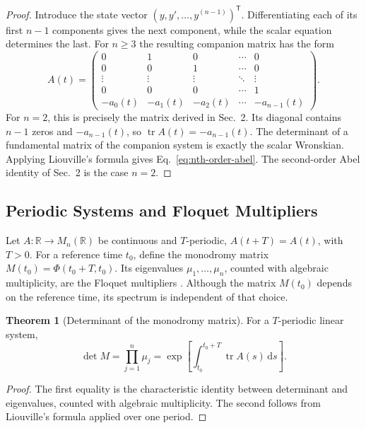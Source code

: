 \documentclass[11pt,a4paper]{article}
\newcommand{\be}{\begin{equation}}
\newcommand{\ee}{\end{equation}}
\newcommand{\lb}[1]{\label{#1}}
\newcommand{\dd}{\mathrm{d}}
\newcommand{\R}{\mathbb{R}}
\DeclareMathOperator{\tr}{tr}
\theoremstyle{definition}
\newtheorem{theorem}{Theorem}[section]
\numberwithin{equation}{section}
\begin{document}
\begin{proof}
Introduce the state vector $(y,y',\ldots,y^{(n-1)})^{\mathsf T}$. Differentiating each of its first $n-1$ components gives the next component, while the scalar equation determines the last. For $n\geq3$ the resulting companion matrix has the form
\be
A(t)=\begin{pmatrix}
0&1&0&\cdots&0\\
0&0&1&\cdots&0\\
\vdots&\vdots&\vdots&\ddots&\vdots\\
0&0&0&\cdots&1\\
-a_0(t)&-a_1(t)&-a_2(t)&\cdots&-a_{n-1}(t)
\end{pmatrix}.
\lb{eq:abel-general-companion}
\ee
For $n=2$, this is precisely the matrix derived in Sec.~2. Its diagonal contains $n-1$ zeros and $-a_{n-1}(t)$, so $\tr A(t)=-a_{n-1}(t)$. The determinant of a fundamental matrix of the companion system is exactly the scalar Wronskian. Applying Liouville's formula gives Eq.~\eqref{eq:nth-order-abel}. The second-order Abel identity of Sec.~2 is the case $n=2$.
\end{proof}

\subsection{Periodic Systems and Floquet Multipliers}

Let $A:\R\to M_n(\R)$ be continuous and $T$-periodic, $A(t+T)=A(t)$, with $T>0$. For a reference time $t_0$, define the monodromy matrix $M(t_0)=\Phi(t_0+T,t_0)$. Its eigenvalues $\mu_1,\ldots,\mu_n$, counted with algebraic multiplicity, are the Floquet multipliers \cite{yakubovich1975,teschl2012}. Although the matrix $M(t_0)$ depends on the reference time, its spectrum is independent of that choice.

\begin{theorem}[Determinant of the monodromy matrix]
For a $T$-periodic linear system,
\be
\det M
=
\prod_{j=1}^{n}\mu_j
=
\exp\left[
\int_{t_0}^{t_0+T}\tr A(s)\,\dd s
\right].
\lb{eq:floquet-product}
\ee
\end{theorem}

\begin{proof}
The first equality is the characteristic identity between determinant and eigenvalues, counted with algebraic multiplicity. The second follows from Liouville's formula applied over one period.
\end{proof}
\end{document}
